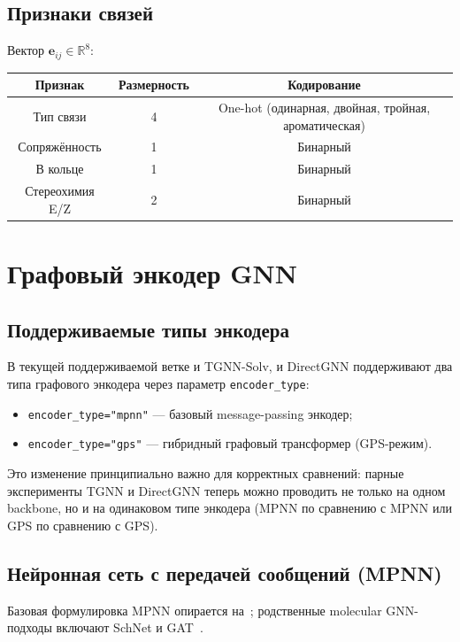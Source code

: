 \documentclass[11pt]{article}
\begin{document}
\subsection{Признаки связей}

Вектор $\mathbf{e}_{ij} \in \mathbb{R}^{8}$:

\begin{center}
\begin{tabular}{|c|c|c|}
\hline
Признак & Размерность & Кодирование \\
\hline
Тип связи & 4 & One-hot (одинарная, двойная, тройная, ароматическая) \\
\hline
Сопряжённость & 1 & Бинарный \\
\hline
В кольце & 1 & Бинарный \\
\hline
Стереохимия E/Z & 2 & Бинарный \\
\hline
\end{tabular}
\end{center}

\section{Графовый энкодер GNN}
\label{sec:gnn-encoder}

\subsection{Поддерживаемые типы энкодера}

В текущей поддерживаемой ветке и TGNN-Solv, и DirectGNN поддерживают два типа графового энкодера через параметр
\texttt{encoder\_type}:
\begin{itemize}
  \item \texttt{encoder\_type="mpnn"} --- базовый message-passing энкодер;
  \item \texttt{encoder\_type="gps"} --- гибридный графовый трансформер (GPS-режим).
\end{itemize}

Это изменение принципиально важно для корректных сравнений: парные эксперименты TGNN и DirectGNN теперь можно проводить не только на одном backbone, но и на одинаковом типе энкодера (MPNN по сравнению с MPNN или GPS по сравнению с GPS).

\subsection{Нейронная сеть с передачей сообщений (MPNN)}

Базовая формулировка MPNN опирается на~\cite{gilmer2017}; родственные molecular GNN-подходы включают SchNet и GAT~\cite{schutt2018,velickovic2018}.
\end{document}
